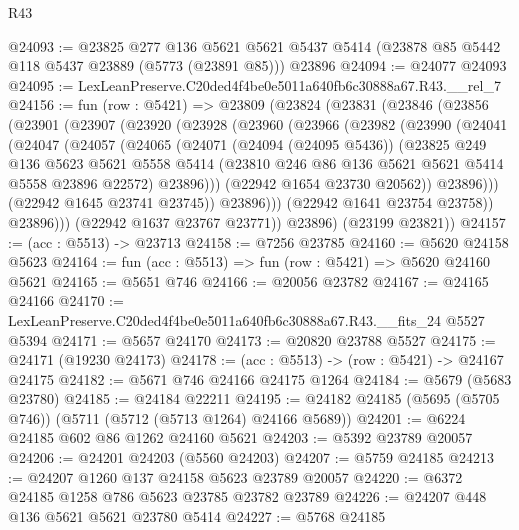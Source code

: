 \begin{lexlean}{R43}
\begin{coremodule}
@24093 := @23825
    @277
    @136
    @5621
    @5621
    @5437
    @5414
    (@23878 @85 @5442 @118 @5437 @23889 (@5773 (@23891 @85)))
    @23896
@24094 := @24077 @24093
@24095 := LexLeanPreserve.C20ded4f4be0e5011a640fb6c30888a67.R43.__rel_7
@24156 := fun (row : @5421) =>
  @23809
    (@23824
      (@23831
        (@23846
          (@23856
            (@23901
              (@23907
                (@23920
                  (@23928
                    (@23960
                      (@23966
                        (@23982
                          (@23990
                            (@24041
                              (@24047
                                (@24057
                                  (@24065
                                    (@24071
                                      (@24094 (@24095 @5436))
                                      (@23825
                                        @249
                                        @136
                                        @5623
                                        @5621
                                        @5558
                                        @5414
                                        (@23810 @246 @86 @136 @5621 @5621 @5414 @5558 @23896 @22572)
                                        @23896)))
                                  (@22942 @1654 @23730 @20562))
                                @23896)))
                          (@22942 @1645 @23741 @23745))
                        @23896)))
                  (@22942 @1641 @23754 @23758))
                @23896)))
          (@22942 @1637 @23767 @23771))
        @23896)
      (@23199 @23821))
@24157 := (acc : @5513) -> @23713
@24158 := @7256 @23785
@24160 := @5620 @24158 @5623
@24164 := fun (acc : @5513) => fun (row : @5421) => @5620 @24160 @5621
@24165 := @5651 @746
@24166 := @20056 @23782
@24167 := @24165 @24166
@24170 := LexLeanPreserve.C20ded4f4be0e5011a640fb6c30888a67.R43.__fits_24 @5527 @5394
@24171 := @5657 @24170
@24173 := @20820 @23788 @5527
@24175 := @24171 (@19230 @24173)
@24178 := (acc : @5513) -> (row : @5421) -> @24167 @24175
@24182 := @5671 @746 @24166 @24175 @1264
@24184 := @5679 (@5683 @23780)
@24185 := @24184 @22211
@24195 := @24182 @24185 (@5695 (@5705 @746)) (@5711 (@5712 (@5713 @1264) @24166 @5689))
@24201 := @6224 @24185 @602 @86 @1262 @24160 @5621
@24203 := @5392 @23789 @20057
@24206 := @24201 @24203 (@5560 @24203)
@24207 := @5759 @24185
@24213 := @24207 @1260 @137 @24158 @5623 @23789 @20057
@24220 := @6372 @24185 @1258 @786 @5623 @23785 @23782 @23789
@24226 := @24207 @448 @136 @5621 @5621 @23780 @5414
@24227 := @5768 @24185

\end{coremodule}
\end{lexlean}
